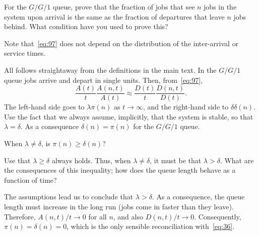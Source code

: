 \begin{exercise}
 For the $G/G/1$ queue, prove that the fraction of jobs that see $n$ jobs in the system upon arrival is the same as the fraction of departures that leave $n$ jobs behind.
 What condition have you used to prove this?
\begin{hint}
Note that~\cref{eq:97}  does not depend on the distribution of the inter-arrival or service times.
\end{hint}
\begin{solution}
 All follows straightaway from the definitions in the main text.
 In the $G/G/1$ queue jobs arrive and depart in single units.
 Then, from~\cref{eq:97},
 \begin{equation*}
 \frac{A(t)}{t}\frac{A(n,t)}{A(t)} \approx 
 \frac{D(t)}{t}\frac{D(n,t)}{D(t)}. 
 \end{equation*}
 The left-hand side goes to $\lambda \pi(n)$ as $t\to\infty$, and
 the right-hand side to $\delta \delta(n)$. Use the fact that we
 always assume, implicitly, that the system is stable, so that
 $\lambda = \delta$. As a consequence $\delta(n) = \pi(n)$ for the $G/G/1$ queue.
\end{solution}
\end{exercise}


\begin{exercise}
 When $\lambda\neq \delta$, is $\pi(n)\geq \delta(n)$? 
\begin{hint}
 Use that $\lambda \geq \delta$ always holds. Thus, when $\lambda \neq \delta$, it must be that $\lambda > \delta$. What are the consequences of this inequality; how does the queue length behave as a function of time?
\end{hint}
\begin{solution}
 The assumptions lead us to conclude that $\lambda > \delta$. As a consequence, the queue length must increase in the long run (jobs come in faster than they leave). Therefore, $A(n,t)/t \to 0$ for all $n$, and also $D(n,t)/t\to 0$. Consequently, $\pi(n) = \delta(n) = 0$, which is the only sensible reconciliation with~\cref{eq:36}. 
\end{solution}
\end{exercise}

